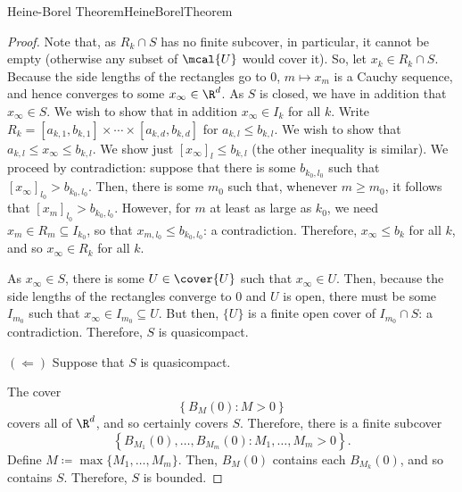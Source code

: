 \begin{thm}{Heine-Borel Theorem}{HeineBorelTheorem}
\begin{proof}
Note that, as $R_k\cap S$ has no finite subcover, in particular, it cannot be empty (otherwise any subset of $\mcal{U}$ would cover it).  So, let $x_k\in R_k\cap S$.  Because the side lengths of the rectangles go to $0$, $m\mapsto x_m$ is a Cauchy sequence, and hence converges to some $x_\infty \in \R ^d$.  As $S$ is closed, we have in addition that $x_\infty \in S$.  We wish to show that in addition $x_\infty \in I_k$ for all $k$.  Write $R_k=[a_{k,1},b_{k,1}]\times \cdots \times [a_{k,d},b_{k,d}]$ for $a_{k,l}\leq b_{k,l}$.  We wish to show that $a_{k,l}\leq x_\infty \leq b_{k,l}$.  We show just $[x_\infty] _l\leq b_{k,l}$ (the other inequality is similar).  We proceed by contradiction:  suppose that there is some $b_{k_0,l_0}$ such that $[x_\infty ]_{l_0}>b_{k_0,l_0}$.  Then, there is some $m_0$ such that, whenever $m\geq m_0$, it follows that $[x_m]_{l_0}>b_{k_0,l_0}$.  However, for $m$ at least as large as $k_0$, we need $x_m\in R_m\subseteq I_{k_0}$, so that $x_{m,l_0}\leq b_{k_0,l_0}$:  a contradiction.  Therefore, $x_\infty \leq b_k$ for all $k$, and so $x_\infty \in R_k$ for all $k$.

As $x_\infty \in S$, there is some $U\in \cover{U}$ such that $x_\infty \in U$.  Then, because the side lengths of the rectangles converge to $0$ and $U$ is open, there must be some $I_{m_0}$ such that $x_\infty \in I_{m_0}\subseteq U$.  But then, $\{ U\}$ is a finite open cover of $I_{m_0}\cap S$:  a contradiction.  Therefore, $S$ is quasicompact.

\blankline
\noindent
$(\Leftarrow )$
Suppose that $S$ is quasicompact.

The cover
\begin{equation}
\left\{ B_M(0):M>0\right\}
\end{equation}
covers all of $\R ^d$, and so certainly covers $S$.  Therefore, there is a finite subcover
\begin{equation}
\left\{ B_{M_1}(0),\ldots ,B_{M_m}(0):M_1,\ldots ,M_m>0\right\} .
\end{equation}Define $M\coloneqq \max \{ M_1,\ldots ,M_m\}$.  Then, $B_M(0)$ contains each $B_{M_k}(0)$, and so contains $S$.  Therefore, $S$ is bounded.


\end{proof}
\end{thm}
